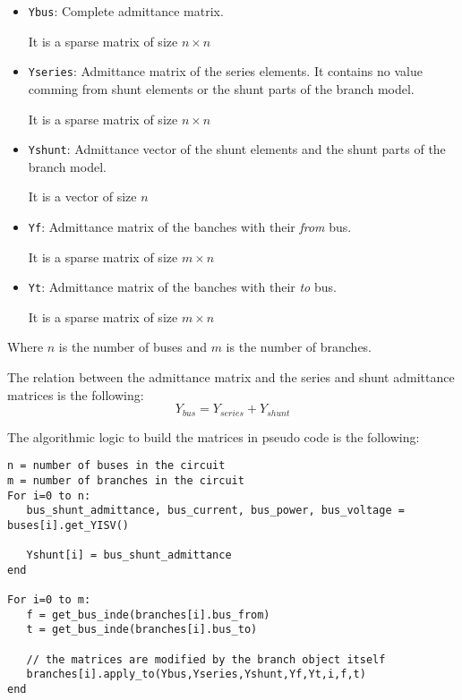 \documentclass[11pt,fleqn]{book} %
\begin{document}
\begin{itemize}
	\item \verb|Ybus|: Complete admittance matrix.
	
	It is a sparse matrix of size $n \times n$
	
	\item \verb|Yseries|: Admittance matrix of the series elements. It contains no value comming from shunt elements or the shunt parts of the branch model.
	
	It is a sparse matrix of size $n \times n$
	
	\item \verb|Yshunt|: Admittance vector of the shunt elements and the shunt parts of the branch model. 
	
	It is a vector of size $n$
	
	\item \verb|Yf|: Admittance matrix of the banches with their \textit{from} bus.
	
	It is a sparse matrix of size $m \times n$
	 
	\item \verb|Yt|: Admittance matrix of the banches with their \textit{to} bus.
	
	It is a sparse matrix of size $m \times n$\newline
\end{itemize}

Where $n$ is the number of buses and $m$ is the number of branches.

The relation between the admittance matrix and the series and shunt admittance matrices is the following:
\begin{equation}
Y_{bus} = Y_{series} + Y_{shunt}
\end{equation}

The algorithmic logic to build the matrices in pseudo code is the following:

\begin{verbatim}
n = number of buses in the circuit
m = number of branches in the circuit
For i=0 to n:
   bus_shunt_admittance, bus_current, bus_power, bus_voltage = buses[i].get_YISV()
   
   Yshunt[i] = bus_shunt_admittance
end

For i=0 to m:
   f = get_bus_inde(branches[i].bus_from)
   t = get_bus_inde(branches[i].bus_to)
   
   // the matrices are modified by the branch object itself
   branches[i].apply_to(Ybus,Yseries,Yshunt,Yf,Yt,i,f,t)
end
	
\end{verbatim}
\end{document}
